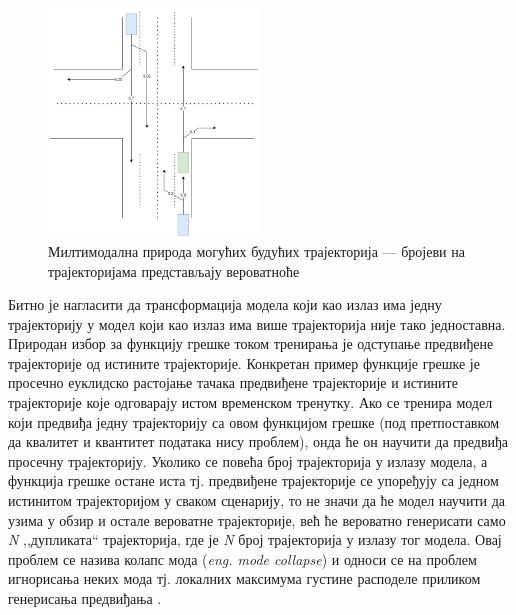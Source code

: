 \documentclass[11pt,oneside]{memoir}
\begin{document}
\begin{figure}[H]
  \centering
  \includegraphics[width=0.5\textwidth]{images/multimodal.drawio.png}
  \caption{Милтимодална природа могућих будућих трајекторија --- бројеви на трајекторијама представљају вероватноће}
  \label{multimodal-example}
\end{figure}

Битно је нагласити да трансформација модела који као излаз има једну трајекторију у модел који као излаз има више трајекторија није тако једноставна.
Природан избор за функцију грешке током тренирања је одступање предвиђене трајекторије од истините трајекторије. Конкретан пример
функције грешке је просечно еуклидско растојање тачака предвиђене трајекторије и истините трајекторије које одговарају истом временском тренутку. Ако
се тренира модел који предвиђа једну трајекторију са овом функцијом грешке (под претпоставком да квалитет и квантитет података нису проблем), 
онда ће он научити да предвиђа просечну трајекторију. Уколико се повећа број трајекторија у излазу модела, а функција грешке остане иста тј. предвиђене
трајекторије се упоређују са једном истинитом трајекторијом у сваком сценарију, то не значи да ће модел научити да узима у обзир и остале
вероватне трајекторије, већ ће вероватно генерисати само \textit{N} ,,дупликата`` трајекторија, где је \textit{N} број трајекторија у излазу 
тог модела. Овај проблем се назива колапс мода (\textit{eng. mode collapse}) и односи се на проблем игнорисања неких мода 
тј. локалних максимума густине расподеле приликом генерисања предвиђања \cite{overcoming_mode_collapse}.
\end{document}
